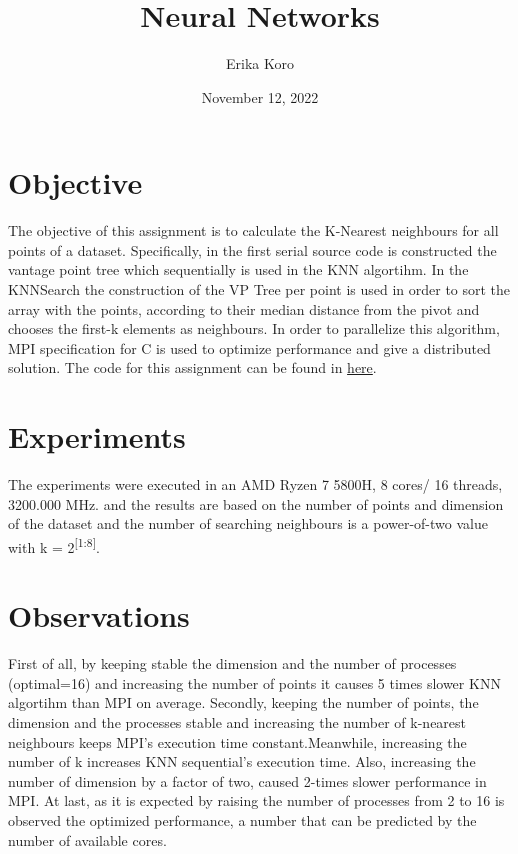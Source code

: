 \documentclass[12pt, a4paper]{report}
\title{\quad Neural Networks}
\author{Erika Koro}
\date{November 12, 2022}
\begin{document}
    \maketitle

    \newpage 
    \section*{Objective}

    The objective of this assignment is to calculate the K-Nearest neighbours for all points of 
    a dataset. Specifically, in the first serial source code is constructed the vantage point
    tree which sequentially is used in the KNN algortihm. In the KNNSearch the construction of the
    VP Tree per point is used in order to sort the array with the points, according to their median distance
    from the pivot and chooses the first-k elements as neighbours.
    In order to parallelize this algorithm, MPI specification for C is used to optimize performance
    and give a distributed solution. The code for this assignment can be found
    in \href{https://github.com/ErikaKoro/PDS4}{here}.



    \section*{Experiments}
    
    The experiments were executed in an AMD Ryzen 7 5800H, 8 cores/ 16 threads, 3200.000 MHz.
    and the results are based on the number of points and dimension of the dataset and the 
    number of searching neighbours is a power-of-two value with k = 2\textsuperscript{[1:8]}. 


    \section*{Observations}

    First of all, by keeping stable the dimension and the number of processes (optimal=16) and increasing the
    number of points it causes 5 times slower KNN algortihm than MPI on average. Secondly, keeping the number of
    points, the dimension and the processes stable and increasing the number of k-nearest neighbours keeps MPI's
    execution time constant.Meanwhile, increasing the number of k increases KNN sequential's execution time. Also,
    increasing the number of dimension by a factor of two, caused 2-times slower performance in MPI. At last, as it is expected by raising the number of processes from 2 to 16 is observed the optimized
    performance, a number that can be predicted by the number of available cores. 
\end{document}
